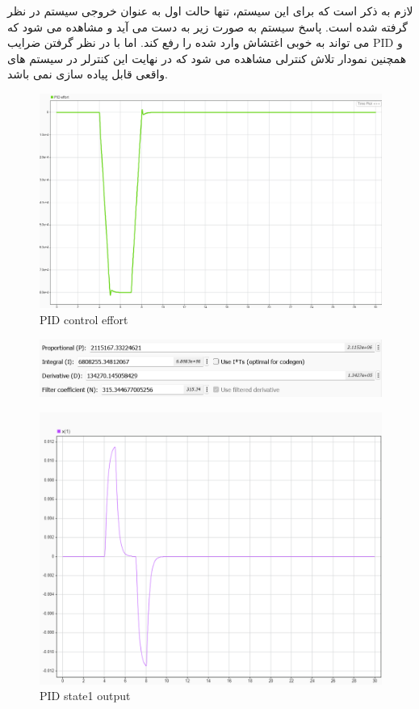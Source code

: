 لازم به ذکر است که برای این سیستم، تنها حالت اول به عنوان خروجی سیستم در نظر گرفته شده است. پاسخ سیستم به صورت زیر به دست می آید و مشاهده می شود که می تواند به خوبی اغتشاش وارد شده را رفع کند. اما با در نظر گرفتن ضرایب PID و همچنین نمودار تلاش کنترلی مشاهده می شود که در نهایت این کنترلر در سیستم های واقعی قابل پیاده سازی نمی باشد.

\begin{figure}[H]
	\centering
	\includegraphics[width=1\linewidth]{../img/9}
	\caption{PID control effort}
	\label{fig:9}
\end{figure}

\begin{figure}[H]
	\centering
	\includegraphics[width=0.7\linewidth]{../img/10}
	\caption{}
	\label{fig:10}
\end{figure}

\begin{figure}[H]
	\centering
	\includegraphics[width=1\linewidth]{../img/11}
	\caption{PID state1 output}
	\label{fig:11}
\end{figure}

